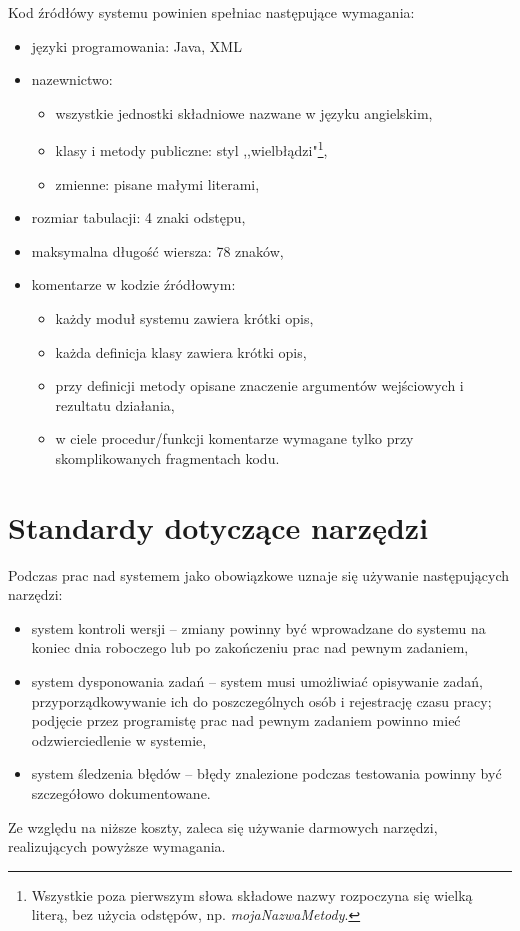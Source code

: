 \documentclass[12pt,leqno, twoside]{mwart}
\begin{document}
	Kod źródłówy systemu powinien spełniac następujące wymagania:
	\begin{itemize}
		\item języki programowania: Java, XML
		\item nazewnictwo:
			\begin{itemize}
				\item wszystkie jednostki składniowe nazwane w języku angielskim,
				\item klasy i metody publiczne: styl ,,wielbłądzi"\footnote{Wszystkie poza pierwszym słowa składowe nazwy
					rozpoczyna się wielką literą, bez użycia odstępów, np. \emph{mojaNazwaMetody}.},
				\item zmienne: pisane małymi literami,
			\end{itemize}
 		\item rozmiar tabulacji: 4 znaki odstępu,
		\item maksymalna długość wiersza: 78 znaków,
		\item komentarze w kodzie źródłowym:
			\begin{itemize}
				\item każdy moduł systemu zawiera krótki opis,
				\item każda definicja klasy zawiera krótki opis,
				\item przy definicji metody opisane znaczenie argumentów wejściowych i rezultatu działania,
				\item w ciele procedur/funkcji komentarze wymagane tylko przy skomplikowanych fragmentach kodu.
			\end{itemize}
	\end{itemize}

	\section{Standardy dotyczące narzędzi}
	
	Podczas prac nad systemem jako obowiązkowe uznaje się używanie następujących narzędzi:
	\begin{itemize}
		\item system kontroli wersji -- zmiany powinny być wprowadzane do systemu na koniec dnia roboczego lub po zakończeniu prac nad pewnym zadaniem,
		\item system dysponowania zadań -- system musi umożliwiać opisywanie zadań, przyporządkowywanie ich do poszczególnych osób i rejestrację czasu pracy; podjęcie przez programistę prac nad pewnym zadaniem powinno mieć odzwierciedlenie w systemie,
		\item system śledzenia błędów -- błędy znalezione podczas testowania powinny być szczegółowo dokumentowane.
	\end{itemize}

	Ze względu na niższe koszty, zaleca się używanie darmowych narzędzi, realizujących powyższe wymagania.
	
\end{document}

